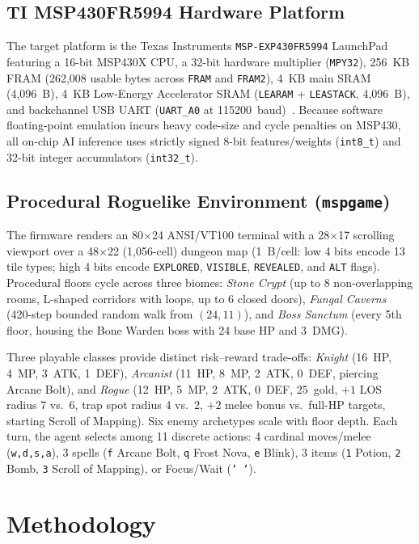 \documentclass[conference]{IEEEtran}
\begin{document}
\subsection{TI MSP430FR5994 Hardware Platform}
The target platform is the Texas Instruments \texttt{MSP-EXP430FR5994} LaunchPad featuring a 16-bit MSP430X CPU, a 32-bit hardware multiplier (\texttt{MPY32}), 256~KB FRAM (262,008 usable bytes across \texttt{FRAM} and \texttt{FRAM2}), 4~KB main SRAM (4,096~B), 4~KB Low-Energy Accelerator SRAM (\texttt{LEARAM} + \texttt{LEASTACK}, 4,096~B), and backchannel USB UART (\texttt{UART\_A0} at 115200~baud)~\cite{ti_ds,ti_ug}. Because software floating-point emulation incurs heavy code-size and cycle penalties on MSP430, all on-chip AI inference uses strictly signed 8-bit features/weights (\texttt{int8\_t}) and 32-bit integer accumulators (\texttt{int32\_t}).

\subsection{Procedural Roguelike Environment (\texttt{mspgame})}
The firmware renders an 80$\times$24 ANSI/VT100 terminal with a 28$\times$17 scrolling viewport over a 48$\times$22 (1,056-cell) dungeon map (1~B/cell: low 4 bits encode 13 tile types; high 4 bits encode \texttt{EXPLORED}, \texttt{VISIBLE}, \texttt{REVEALED}, and \texttt{ALT} flags). Procedural floors cycle across three biomes: \emph{Stone Crypt} (up to 8 non-overlapping rooms, L-shaped corridors with loops, up to 6 closed doors), \emph{Fungal Caverns} (420-step bounded random walk from $(24, 11)$), and \emph{Boss Sanctum} (every 5th floor, housing the Bone Warden boss with 24 base HP and 3~DMG).

Three playable classes provide distinct risk--reward trade-offs: \emph{Knight} (16~HP, 4~MP, 3~ATK, 1~DEF), \emph{Arcanist} (11~HP, 8~MP, 2~ATK, 0~DEF, piercing Arcane Bolt), and \emph{Rogue} (12~HP, 5~MP, 2~ATK, 0~DEF, 25~gold, $+1$ LOS radius 7 vs.\ 6, trap spot radius 4 vs.\ 2, $+2$ melee bonus vs.\ full-HP targets, starting Scroll of Mapping). Six enemy archetypes scale with floor depth. Each turn, the agent selects among 11 discrete actions: 4 cardinal moves/melee (\texttt{w,d,s,a}), 3 spells (\texttt{f} Arcane Bolt, \texttt{q} Frost Nova, \texttt{e} Blink), 3 items (\texttt{1} Potion, \texttt{2} Bomb, \texttt{3} Scroll of Mapping), or Focus/Wait (\texttt{' '}).

\section{Methodology}
\end{document}
